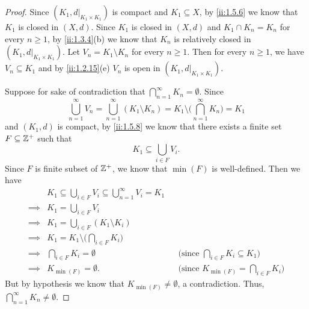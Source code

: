 \begin{proof}
  Since \((K_1, d|_{K_1 \times K_1})\) is compact and \(K_1 \subseteq X\), by \cref{ii:1.5.6} we know that \(K_1\) is closed in \((X, d)\).
  Since \(K_1\) is closed in \((X, d)\) and \(K_1 \cap K_n = K_n\) for every \(n \geq 1\), by \cref{ii:1.3.4}(b) we know that \(K_n\) is relatively closed in \((K_1, d|_{K_1 \times K_1})\).
  Let \(V_n = K_1 \setminus K_n\) for every \(n \geq 1\).
  Then for every \(n \geq 1\), we have \(V_n \subseteq K_1\) and by \cref{ii:1.2.15}(e) \(V_n\) is open in \((K_1, d|_{K_1 \times K_1})\).

  Suppose for sake of contradiction that \(\bigcap_{n = 1}^\infty K_n = \emptyset\).
  Since
  \[
    \bigcup_{n = 1}^\infty V_n = \bigcup_{n = 1}^\infty (K_1 \setminus K_n) = K_1 \setminus \bigg(\bigcap_{n = 1}^\infty K_n\bigg) = K_1
  \]
  and \((K_1, d)\) is compact, by \cref{ii:1.5.8} we know that there exists a finite set \(F \subseteq \mathbb{Z}^+\) such that
  \[
    K_1 \subseteq \bigcup_{i \in F} V_i.
  \]
  Since \(F\) is finite subset of \(\mathbb{Z}^+\), we know that \(\min(F)\) is well-defined.
  Then we have
  \begin{align*}
             & K_1 \subseteq \bigcup_{i \in F} V_i \subseteq \bigcup_{n = 1}^\infty V_i = K_1                                                             \\
    \implies & K_1 = \bigcup_{i \in F} V_i                                                                                                                \\
    \implies & K_1 = \bigcup_{i \in F} (K_1 \setminus K_i)                                                                                                \\
    \implies & K_1 = K_1 \setminus \bigg(\bigcap_{i \in F} K_i\bigg)                                                                                      \\
    \implies & \bigcap_{i \in F} K_i = \emptyset                                              &  & \text{(since \(\bigcap_{i \in F} K_i \subseteq K_1)\)} \\
    \implies & K_{\min(F)} = \emptyset.                                                       &  & \text{(since \(K_{\min(F)} = \bigcap_{i \in F} K_i)\)}
  \end{align*}
  But by hypothesis we know that \(K_{\min(F)} \neq \emptyset\), a contradiction.
  Thus, \(\bigcap_{n = 1}^\infty K_n \neq \emptyset\).
\end{proof}

